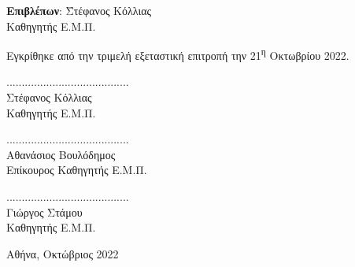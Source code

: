 \begin{titlepage}
\begin{center}
        \vspace{1.0cm}
        \Large
        \begin{flushleft}
        \begin{tabbing}
            
            \textbf{Επιβλέπων}: \= Στέφανος Κόλλιας \\
                                \> Καθηγητής Ε.Μ.Π.
        \end{tabbing}
        \end{flushleft}
        \vspace{0.5cm}
        Εγκρίθηκε από την τριμελή εξεταστική επιτροπή την 21\textsuperscript{η} Οκτωβρίου 2022.
        \vspace{1cm}

        \large
        \parbox[t]{0.3\textwidth} {
            \center
            ........................................ \\
            Στέφανος Κόλλιας \\
            Καθηγητής Ε.Μ.Π.
        }
        \parbox[t]{0.35\textwidth} {
            \center
            ........................................ \\
            Αθανάσιος Βουλόδημος \\
            Επίκουρος Καθηγητής Ε.Μ.Π.
        }
        \parbox[t]{0.3\textwidth} {
            \center
            ........................................ \\
            Γιώργος Στάμου  \\
            Καθηγητής Ε.Μ.Π.
        }


            
        \vspace{1.5cm}
            

        \Large

        Αθήνα, Οκτώβριος 2022
            
    \end{center}
\end{titlepage}
